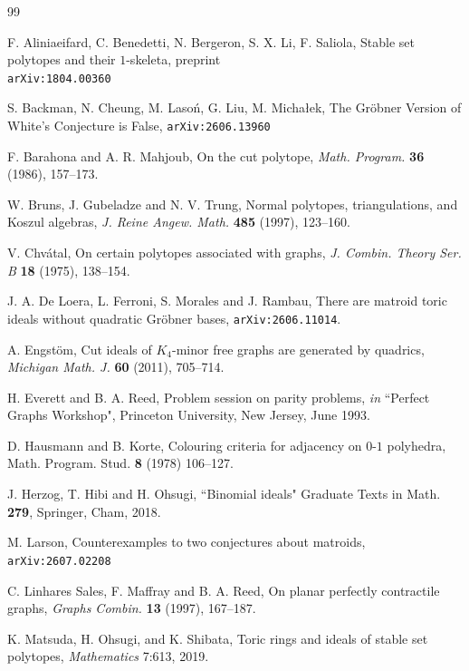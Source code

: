 \documentclass[12pt]{amsart}
\theoremstyle{definition}
\numberwithin{thm}{section}
\numberwithin{equation}{section}
\begin{document}
\begin{thebibliography}{99}

F. Aliniaeifard, C. Benedetti, N. Bergeron, S. X. Li, F. Saliola,
Stable set polytopes and their $1$-skeleta, preprint\\
{\tt arXiv:1804.00360}

S. Backman, N. Cheung, M. Laso\'n, G. Liu, M. Micha\l{}ek,
The Gr\"obner Version of White's Conjecture is False,
{\tt arXiv:2606.13960}


F. Barahona and A. R. Mahjoub, 
On the cut polytope,
{\it Math. Program.} {\bf 36} (1986), 157--173.

W. Bruns, J. Gubeladze and N. V. Trung,
Normal polytopes, triangulations, and Koszul algebras,
{\it J. Reine Angew. Math.} {\bf 485} (1997), 123--160.



 V. Chv\'{a}tal, On certain polytopes associated with graphs, 
 {\it J. Combin. Theory Ser. B}  {\bf 18} (1975), 138--154.

J. A. De Loera, L. Ferroni, S. Morales and J. Rambau,
There are matroid toric ideals without quadratic Gr\"obner bases,
{\tt arXiv:2606.11014}.


A. Engst\"{o}m, Cut ideals of $K_4$-minor free graphs are generated by quadrics, \textit{Michigan Math. J.} {\bf 60} (2011), 705--714.

H. Everett and B. A. Reed,
Problem session on parity problems,
{\em in} ``Perfect Graphs Workshop",
Princeton University, New Jersey, June 1993.


 D. Hausmann and B. Korte,
 Colouring criteria for adjacency on $0$-$1$ polyhedra, 
Math. Program. Stud. {\bf  8} (1978) 106--127. 

J. Herzog, T. Hibi and H. Ohsugi, ``Binomial ideals"
Graduate Texts in Math. {\bf 279}, Springer, Cham, 2018.

M. Larson,
Counterexamples to two conjectures about matroids,
{\tt arXiv:2607.02208}


C. Linhares Sales, F. Maffray and B. A. Reed,
On planar perfectly contractile graphs,
\textit{Graphs Combin.} {\bf 13} (1997), 167--187.

K. Matsuda, H. Ohsugi, and K. Shibata,
Toric rings and ideals of stable set polytopes,
{\it Mathematics} 7:613, 2019.


\end{thebibliography}
\end{document}
